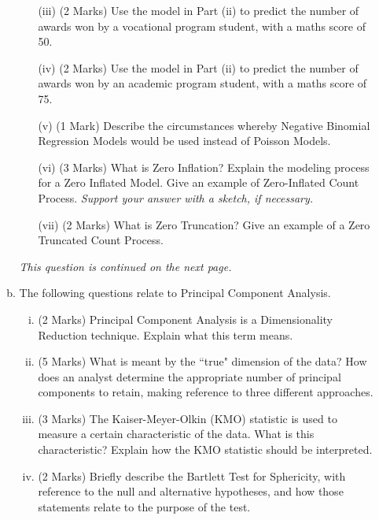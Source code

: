 \documentclass[a4paper,12pt]{article}
\begin{document}
\begin{enumerate}
\begin{enumerate}[(a)]
\begin{itemize}
	\item[(iii)] (2 Marks) Use the model in Part (ii) to predict the number of awards won by a vocational program student, with a maths score of 50.
	
	\item[(iv)] (2 Marks) Use the model in Part (ii) to predict the number of awards won by an academic program student, with a maths score of 75.
	
	\item[(v)] (1 Mark) Describe the circumstances whereby Negative Binomial Regression Models would be used instead of Poisson Models.	
	\item[(vi)] (3 Marks)
	What is Zero Inflation? Explain the modeling process for a Zero Inflated Model. Give an example of Zero-Inflated Count Process. \textit{Support your answer with a sketch, if necessary.}
	
	

	
	
	
	\item[(vii)] (2 Marks) What is Zero Truncation? Give an example of a Zero Truncated Count Process.
\end{itemize}
\noindent \textit{This question is continued on the next page.}
\newpage
\item 
The following questions relate to Principal Component Analysis.
\begin{enumerate}[(i)]

	\item (2 Marks) Principal Component Analysis is a Dimensionality Reduction technique. Explain what this term means.
	\item (5 Marks)	What is meant by the ``true" dimension of the data?  How does an analyst determine the appropriate number of principal components to retain, making reference to three different approaches.
	\item (3 Marks) The Kaiser-Meyer-Olkin (KMO) statistic is used to measure a certain characteristic of the data. What is this characteristic? Explain how the KMO statistic should be interpreted.
	\item (2 Marks) Briefly describe the Bartlett Test for Sphericity, with reference to the null and alternative hypotheses, and how those statements relate to the purpose of the test.
\end{enumerate} 





\end{enumerate}
\end{enumerate}
\end{document}
